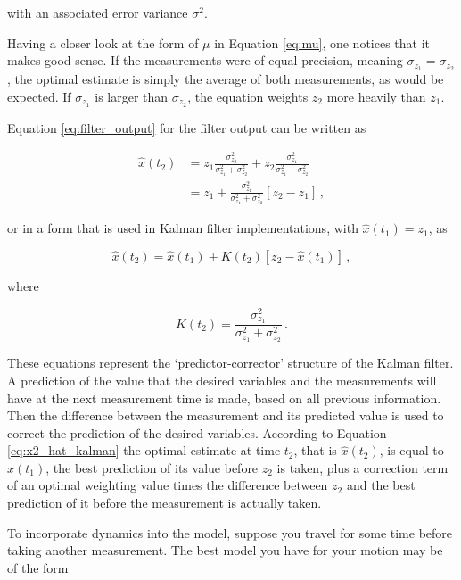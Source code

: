 \noindent
with an associated error variance $\sigma^2$.

Having a closer look at the form of $\mu$ in Equation \ref{eq:mu}, one notices that it makes good sense. If the measurements were of equal precision, meaning $\sigma_{z_1}=\sigma_{z_2}$, the optimal estimate is simply the average of both measurements, as would be expected. If $\sigma_{z_1}$ is larger than $\sigma_{z_2}$, the equation weights $z_2$ more heavily than $z_1$.

Equation \ref{eq:filter_output} for the filter output can be written as

\begin{equation}\label{eq:x2_hat}
\begin{split}
  \hat{x}(t_2) & =z_1\frac{\sigma^2_{z_2}}{\sigma^2_{z_1}+\sigma^2_{z_2}}+z_2\frac{\sigma^2_{z_1}}{\sigma^2_{z_1}+\sigma^2_{z_2}} \\
  & =z_1+\frac{\sigma^2_{z_1}}{\sigma^2_{z_1}+\sigma^2_{z_2}}[z_2-z_1]\,,
\end{split}
\end{equation}

\noindent
or in a form that is used in Kalman filter implementations, with $\hat{x}(t_1)=z_1$, as

\begin{equation}\label{eq:x2_hat_kalman}
  \hat{x}(t_2) = \hat{x}(t_1) + K(t_2)[z_2-\hat{x}(t_1)]\,,
\end{equation}

\noindent
where

\begin{equation}\label{}
  K(t_2) = \frac{\sigma^2_{z_1}}{\sigma^2_{z_1}+\sigma^2_{z_2}}\,.
\end{equation}

\noindent
These equations represent the `predictor-corrector' structure of the Kalman filter. A prediction of the value that the desired variables and the measurements will have at the next measurement time is made, based on all previous information. Then the difference between the measurement and its predicted value is used to correct the prediction of the desired variables. According to Equation \ref{eq:x2_hat_kalman} the optimal estimate at time $t_2$, that is $\hat{x}(t_2)$, is equal to $\hat{x}(t_1)$, the best prediction of its value before $z_2$ is taken, plus a correction term of an optimal weighting value times the difference between $z_2$ and the best prediction of it before the measurement is actually taken.

To incorporate dynamics into the model, suppose you travel for some time before taking another measurement. The best model you have for your motion may be of the form

